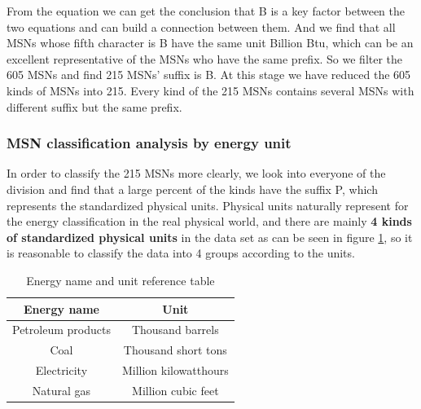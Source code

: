 \documentclass[a4paper,11pt]{article}
\begin{document}
\par From the equation we can get the conclusion that B is a key factor between the two equations and can build a connection between them. And we find that all MSNs whose fifth character is B have the same unit Billion Btu, which can be an excellent representative of the MSNs who have the same prefix. So we filter the 605 MSNs and find 215 MSNs' suffix is B. At this stage we have reduced the 605 kinds of MSNs into 215. Every kind of the 215 MSNs contains several MSNs with different suffix but the same prefix.


\subsubsection {MSN classification analysis by energy unit}


\par In order to classify the 215 MSNs more clearly, we look into everyone of the division and find that a large percent of the kinds have the suffix P, which represents the standardized physical units. Physical units naturally represent for the energy classification in the real physical world, and there are mainly \textbf{4 kinds of standardized physical units} in the data set as can be seen in figure \ref{tab:energy-unit}, so it is reasonable to classify the data into 4 groups according to the units.

\begin{table}[H]
    \centering
    \begin{tabular}{|c|c|}
        \hline Energy name & Unit\\
        \hline Petroleum products & Thousand barrels\\
        \hline Coal & Thousand short tons\\
        \hline Electricity & Million kilowatthours\\
        \hline Natural gas & Million cubic feet\\
        \hline
    \end{tabular}
    \caption{Energy name and unit reference table}
    \label{tab:energy-unit}
\end{table}
\end{document}
